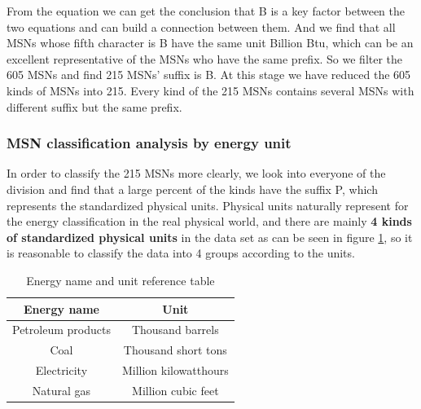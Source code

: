 \documentclass[a4paper,11pt]{article}
\begin{document}
\par From the equation we can get the conclusion that B is a key factor between the two equations and can build a connection between them. And we find that all MSNs whose fifth character is B have the same unit Billion Btu, which can be an excellent representative of the MSNs who have the same prefix. So we filter the 605 MSNs and find 215 MSNs' suffix is B. At this stage we have reduced the 605 kinds of MSNs into 215. Every kind of the 215 MSNs contains several MSNs with different suffix but the same prefix.


\subsubsection {MSN classification analysis by energy unit}


\par In order to classify the 215 MSNs more clearly, we look into everyone of the division and find that a large percent of the kinds have the suffix P, which represents the standardized physical units. Physical units naturally represent for the energy classification in the real physical world, and there are mainly \textbf{4 kinds of standardized physical units} in the data set as can be seen in figure \ref{tab:energy-unit}, so it is reasonable to classify the data into 4 groups according to the units.

\begin{table}[H]
    \centering
    \begin{tabular}{|c|c|}
        \hline Energy name & Unit\\
        \hline Petroleum products & Thousand barrels\\
        \hline Coal & Thousand short tons\\
        \hline Electricity & Million kilowatthours\\
        \hline Natural gas & Million cubic feet\\
        \hline
    \end{tabular}
    \caption{Energy name and unit reference table}
    \label{tab:energy-unit}
\end{table}
\end{document}
